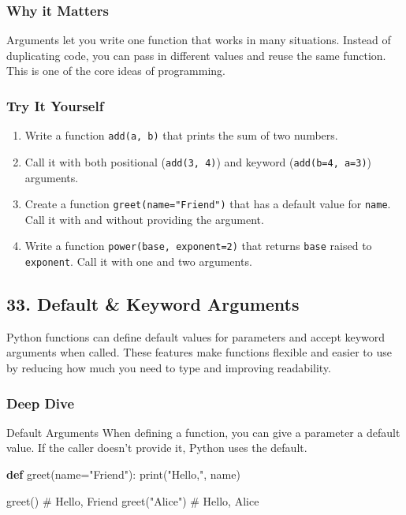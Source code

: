 \documentclass[
  letterpaper,
  DIV=11,
  numbers=noendperiod]{scrreprt}
\newenvironment{Shaded}{\begin{snugshade}}{\end{snugshade}}
\newcommand{\BuiltInTok}[1]{\textcolor[rgb]{0.00,0.23,0.31}{#1}}
\newcommand{\CommentTok}[1]{\textcolor[rgb]{0.37,0.37,0.37}{#1}}
\newcommand{\KeywordTok}[1]{\textcolor[rgb]{0.00,0.23,0.31}{\textbf{#1}}}
\newcommand{\NormalTok}[1]{\textcolor[rgb]{0.00,0.23,0.31}{#1}}
\newcommand{\OperatorTok}[1]{\textcolor[rgb]{0.37,0.37,0.37}{#1}}
\newcommand{\StringTok}[1]{\textcolor[rgb]{0.13,0.47,0.30}{#1}}
\providecommand{\tightlist}{%
  \setlength{\itemsep}{0pt}\setlength{\parskip}{0pt}}
\begin{document}
\subsubsection{Why it Matters}\label{why-it-matters-31}

Arguments let you write one function that works in many situations.
Instead of duplicating code, you can pass in different values and reuse
the same function. This is one of the core ideas of programming.

\subsubsection{Try It Yourself}\label{try-it-yourself-31}

\begin{enumerate}
\def\labelenumi{\arabic{enumi}.}
\tightlist
\item
  Write a function \texttt{add(a,\ b)} that prints the sum of two
  numbers.
\item
  Call it with both positional (\texttt{add(3,\ 4)}) and keyword
  (\texttt{add(b=4,\ a=3)}) arguments.
\item
  Create a function \texttt{greet(name="Friend")} that has a default
  value for \texttt{name}. Call it with and without providing the
  argument.
\item
  Write a function \texttt{power(base,\ exponent=2)} that returns
  \texttt{base} raised to \texttt{exponent}. Call it with one and two
  arguments.
\end{enumerate}

\subsection{33. Default \& Keyword
Arguments}\label{default-keyword-arguments}

Python functions can define default values for parameters and accept
keyword arguments when called. These features make functions flexible
and easier to use by reducing how much you need to type and improving
readability.

\subsubsection{Deep Dive}\label{deep-dive-32}

Default Arguments When defining a function, you can give a parameter a
default value. If the caller doesn't provide it, Python uses the
default.

\begin{Shaded}
\begin{Highlighting}[]
\KeywordTok{def}\NormalTok{ greet(name}\OperatorTok{=}\StringTok{"Friend"}\NormalTok{):}
    \BuiltInTok{print}\NormalTok{(}\StringTok{"Hello,"}\NormalTok{, name)}

\NormalTok{greet()              }\CommentTok{\# Hello, Friend}
\NormalTok{greet(}\StringTok{"Alice"}\NormalTok{)       }\CommentTok{\# Hello, Alice}
\end{Highlighting}
\end{Shaded}
\end{document}
